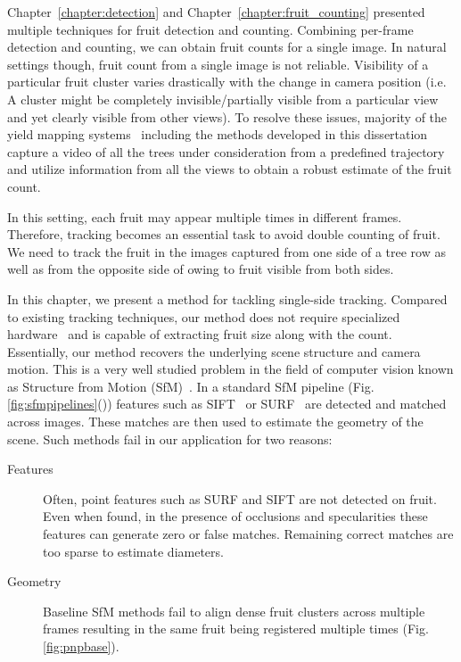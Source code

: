 Chapter~\ref{chapter:detection} and Chapter~\ref{chapter:fruit_counting} presented multiple techniques for fruit detection and counting. Combining per-frame detection and counting, we can obtain fruit counts for a single image. In natural settings though, fruit count from a single image is not reliable. Visibility of a particular fruit cluster varies drastically with the change in camera position (i.e. A cluster might be completely invisible/partially visible from a particular view and yet clearly visible from other views). To resolve these issues, majority of the yield mapping systems~\cite{bargoti_deep_2017,wang,stein_image_2016,gongal_apple_2016,das_devices_2015} including the methods developed in this dissertation capture a video of all the trees under consideration from a predefined trajectory and utilize information from all the views to obtain a robust estimate of the fruit count.

In this setting, each fruit may appear multiple times in different frames. Therefore, tracking becomes an essential task to avoid double counting of fruit. We need to track the fruit in the images captured from one side of a tree row as well as from the opposite side of owing to fruit visible from both sides. 

In this chapter, we present a method for tackling single-side tracking. Compared to existing tracking techniques, our method does not require specialized hardware~\cite{wang,gongal_apple_2016} and is capable of extracting fruit size along with the count. Essentially, our method recovers the underlying scene structure and camera motion. This is a very well studied problem in the field of computer vision known as Structure from Motion (SfM)~\cite{sinha2014multi}. In  a standard SfM pipeline (Fig.\ref{fig:sfmpipelines}()) features such as SIFT~\cite{surffeature} or SURF~\cite{sift} are detected and matched across images. These matches are then used to estimate the geometry of the scene. Such methods fail in our application for two reasons:
\begin{description}
\item[Features] Often, point features such as SURF and SIFT are not detected on fruit. Even when found, in the presence of occlusions and specularities these features can generate zero or false matches. Remaining correct matches are too sparse to estimate diameters.
\item[Geometry] Baseline SfM methods fail to align dense fruit clusters across multiple frames resulting in the same fruit being registered multiple times (Fig.\ref{fig:pnpbase}).
\end{description}

